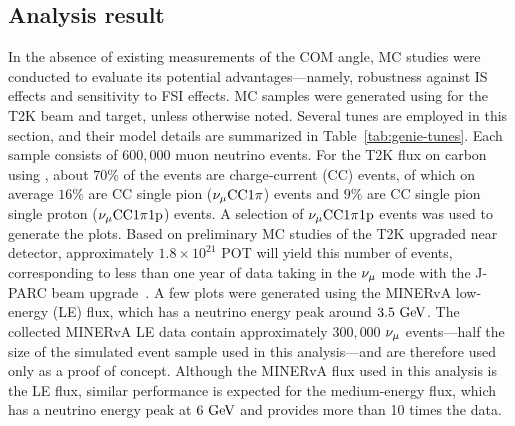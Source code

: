      \subsection{Analysis result}
     \label{sec:com-ana}
     In the absence of existing measurements of the COM angle, MC studies were conducted to evaluate its potential advantages—namely, robustness against IS effects and sensitivity to FSI effects.
     MC samples were generated using \genie \cite{Andreopoulos:2009rq, GENIE:2021npt} for the T2K beam and target, unless otherwise noted. 
     Several \genie tunes are employed in this section, and their model details are summarized in Table~\ref{tab:genie-tunes}.
     Each sample consists of $600,000$ muon neutrino events. 
     For the T2K flux on carbon using \gZero, about $70\%$ of the events are charge‐current (CC) events, of which on average $16\%$ are CC single pion ($\nu_{\mu}\textrm{CC}1\pi$) events and $9\%$ are CC single pion single proton ($\nu_{\mu}\textrm{CC}1\pi1\textrm{p}$) events.
     A selection of $\nu_{\mu}\textrm{CC}1\pi1\textrm{p}$ events was used to generate the plots.
     Based on preliminary MC studies of the T2K upgraded near detector, approximately $1.8\times10^{21}$ POT will yield this number of events, corresponding to less than one year of data taking in the $\nu_{\mu}$ mode with the J-PARC beam upgrade~\cite{T2K:2019eao}.
     A few plots were generated using the MINERvA low-energy (LE) flux, which has a neutrino energy peak around $3.5~\textrm{GeV}$.
     The collected MINERvA LE data contain approximately $300,000$ $\nu_{\mu}$ events—half the size of the simulated event sample used in this analysis—and are therefore used only as a proof of concept.
     Although the MINERvA flux used in this analysis is the LE flux, similar performance is expected for the medium-energy flux, which has a neutrino energy peak at $6~\textrm{GeV}$ and provides more than 10 times the data.
